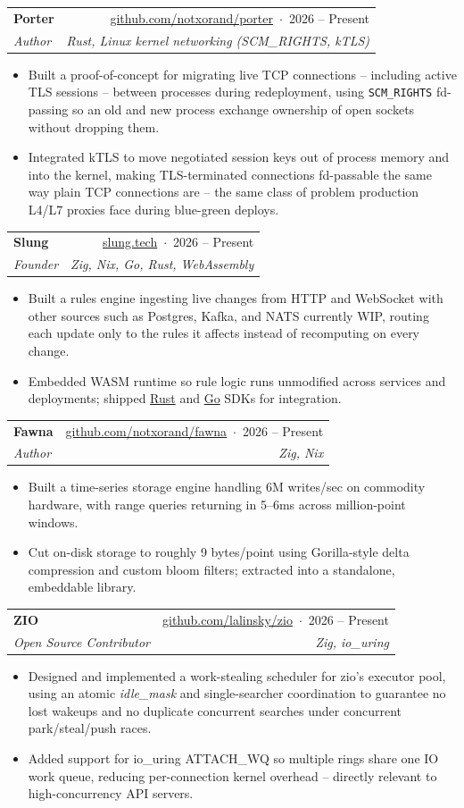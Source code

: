 \documentclass[a4paper, 10pt]{article}
\makeatletter
\newcommand{\resumeItem}[1]{ \item\small{ {#1 \vspace{-2pt}} } }
\newcommand{\resumeSubheading}[4]{
\vspace{-1pt}
\item
\begin{tabular*}{0.98\textwidth}[t]{l@{\extracolsep{\fill}}r}
    \textbf{#1}       & #2                 \\
    \textit{\small#3} & \textit{\small #4} \\
\end{tabular*}
\vspace{-8pt}
}
\newcommand{\resumeItemListStart}{\begin{itemize}[leftmargin=0.15in]}
\newcommand{\resumeItemListEnd}{\end{itemize}
\vspace{-6pt}}
\makeatother
\begin{document}
    \resumeSubheading {Porter}{\href{https://github.com/notxorand/porter}{github.com/notxorand/porter} \,$\cdot$\, 2026 -- Present}
    {Author}{Rust, Linux kernel networking (SCM\_RIGHTS, kTLS)}
    \resumeItemListStart \resumeItem{Built a proof-of-concept for migrating live TCP connections -- including active TLS sessions -- between processes during redeployment, using \texttt{SCM\_RIGHTS} fd-passing so an old and new process exchange ownership of open sockets without dropping them.}
    \resumeItem{Integrated kTLS to move negotiated session keys out of process memory and into the kernel, making TLS-terminated connections fd-passable the same way plain TCP connections are -- the same class of problem production L4/L7 proxies face during blue-green deploys.}
    \resumeItemListEnd

    \resumeSubheading {Slung}{\href{https://slung.tech}{slung.tech} \,$\cdot$\, 2026 -- Present}
    {Founder}{Zig, Nix, Go, Rust, WebAssembly}
    \resumeItemListStart \resumeItem{Built a rules engine ingesting live changes from HTTP and WebSocket with other sources such as Postgres, Kafka, and NATS currently WIP, routing each update only to the rules it affects instead of recomputing on every change.}
    \resumeItem{Embedded WASM runtime so rule logic runs unmodified across services and deployments; shipped \href{https://docs.rs/slung}{Rust} and \href{https://github.com/slunghq/slung/tree/dev/sdks/go}{Go} SDKs for integration.}
    \resumeItemListEnd

    \resumeSubheading {Fawna}{\href{https://github.com/notxorand/fawna}{github.com/notxorand/fawna} \,$\cdot$\, 2026 -- Present}
    {Author}{Zig, Nix}
    \resumeItemListStart \resumeItem{Built a time-series storage engine handling 6M writes/sec on commodity hardware, with range queries returning in 5--6ms across million-point windows.}
    \resumeItem{Cut on-disk storage to roughly 9 bytes/point using Gorilla-style delta compression and custom bloom filters; extracted into a standalone, embeddable library.}
    \resumeItemListEnd

    \resumeSubheading {ZIO}{\href{https://github.com/lalinsky/zio}{github.com/lalinsky/zio} \,$\cdot$\, 2026 -- Present}
    {Open Source Contributor}{Zig, io\_uring}
    \resumeItemListStart \resumeItem{Designed and implemented a work-stealing scheduler for zio's executor pool, using an atomic \textit{idle\_mask} and single-searcher coordination to guarantee no lost wakeups and no duplicate concurrent searches under concurrent park/steal/push races.}
    \resumeItem{Added support for io\_uring ATTACH\_WQ so multiple rings share one IO work queue, reducing per-connection kernel overhead -- directly relevant to high-concurrency API servers.}
    \resumeItemListEnd
\end{document}
